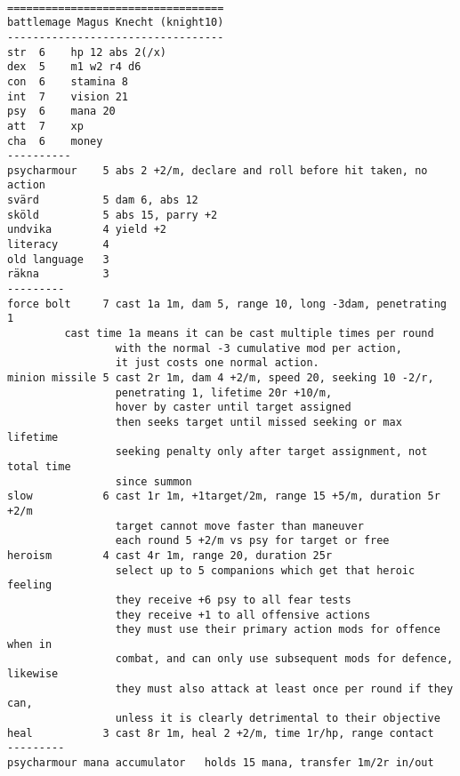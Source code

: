 \

\pagebreak[1]
\tiny \begin{samepage} \begin{verbatim}
==================================
battlemage Magus Knecht (knight10)
----------------------------------
str  6    hp 12 abs 2(/x)
dex  5    m1 w2 r4 d6
con  6    stamina 8
int  7    vision 21
psy  6    mana 20
att  7    xp
cha  6    money
----------
psycharmour    5 abs 2 +2/m, declare and roll before hit taken, no action
svärd          5 dam 6, abs 12
sköld          5 abs 15, parry +2
undvika        4 yield +2
literacy       4
old language   3
räkna          3
---------
force bolt     7 cast 1a 1m, dam 5, range 10, long -3dam, penetrating 1
		 cast time 1a means it can be cast multiple times per round
                 with the normal -3 cumulative mod per action,
                 it just costs one normal action.
minion missile 5 cast 2r 1m, dam 4 +2/m, speed 20, seeking 10 -2/r,
                 penetrating 1, lifetime 20r +10/m,
                 hover by caster until target assigned
                 then seeks target until missed seeking or max lifetime
                 seeking penalty only after target assignment, not total time
                 since summon
slow           6 cast 1r 1m, +1target/2m, range 15 +5/m, duration 5r +2/m
                 target cannot move faster than maneuver
                 each round 5 +2/m vs psy for target or free
heroism        4 cast 4r 1m, range 20, duration 25r
                 select up to 5 companions which get that heroic feeling
                 they receive +6 psy to all fear tests
                 they receive +1 to all offensive actions
                 they must use their primary action mods for offence when in
                 combat, and can only use subsequent mods for defence, likewise
                 they must also attack at least once per round if they can,
                 unless it is clearly detrimental to their objective
heal           3 cast 8r 1m, heal 2 +2/m, time 1r/hp, range contact
---------
psycharmour mana accumulator   holds 15 mana, transfer 1m/2r in/out
\end{verbatim} \end{samepage} \normalsize




